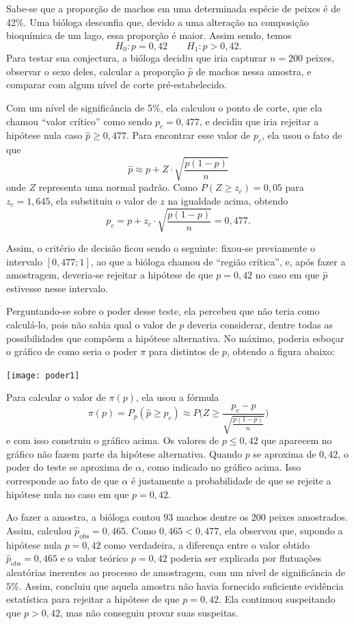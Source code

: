 \documentclass[12pt,a4paper]{article}
\theoremstyle{plain}
\theoremstyle{definition}
\theoremstyle{remark}
\newenvironment{example}{\pushQED{\qed}\renewcommand{\qedsymbol}{\scriptsize$\triangle$}\examplex}{\popQED\endexamplex}
\begin{document}
\begin{example}
Sabe-se que a proporção de machos em uma determinada espécie de peixes é de 42\%. Uma bióloga desconfia que, devido a uma alteração na composição bioquímica de um lago, essa proporção é maior.
Assim sendo, temos
\[
H_0:p=0,42
\qquad
H_1:p>0,42
.
\]
Para testar sua conjectura, a bióloga decidiu que iria capturar $n=200$ peixes, observar o sexo deles, calcular a proporção $\hat{p}$ de machos nessa amostra, e comparar com algum nível de corte pré-estabelecido.

Com um nível de significância de 5\%, ela calculou o ponto de corte, que ela chamou ``valor crítico'' como sendo $p_c=0,477$, e decidiu que iria rejeitar a hipótese nula caso $\hat{p} \geq 0,477$.
Para encontrar esse valor de $p_c$, ela usou o fato de que
\[
\hat{p}
\approx
p + Z \cdot \sqrt{\frac{p(1-p)}{n}}
\]
onde $Z$ representa uma normal padrão.
Como $P(Z\geq z_c)=0,05$ para $z_c = 1,645$, ela substituiu o valor de $z$ na igualdade acima, obtendo
\[
p_c
=
p + z_c \cdot \sqrt{\frac{p(1-p)}{n}}
=
0,477
.
\]

Assim, o critério de decisão ficou sendo o seguinte: fixou-se previamente o intervalo $[0,477; 1]$, ao que a bióloga chamou de ``região crítica'', e, após fazer a amostragem, deveria-se rejeitar a hipótese de que $p=0,42$ no caso em que $\hat{p}$ estivesse nesse intervalo.

Perguntando-se sobre o poder desse teste, ela percebeu que não teria como calculá-lo, pois não sabia qual o valor de $p$ deveria considerar, dentre todas as possibilidades que compõem a hipótese alternativa. No máximo, poderia esboçar o gráfico de como seria o poder $\pi$ para distintos de $p$, obtendo a figura abaixo:

\hfil \texttt{[image: poder1]}

Para calcular o valor de $\pi(p)$, ela usou a fórmula
\[
\pi(p) = P_p(\hat{p} \geq p_c) \approx P\Big(Z \geq \frac{p_c-p}{\sqrt{\frac{p(1-p)}{n}}}\Big)
\]
e com isso construiu o gráfico acima.
Os valores de $p \leq 0,42$ que aparecem no gráfico não fazem parte da hipótese alternativa.
Quando $p$ se aproxima de $0,42$, o poder do teste se aproxima de $\alpha$, como indicado no gráfico acima.
Isso corresponde ao fato de que $\alpha$ é justamente a probabilidade de que se rejeite a hipótese nula no caso em que $p=0,42$.

Ao fazer a amostra, a bióloga contou $93$ machos dentre os $200$ peixes amostrados.
Assim, calculou $\hat{p}_{\mathrm{obs}}=0,465$.
Como $0,465<0,477$, ela observou que, supondo a hipótese nula $p=0,42$ como verdadeira, a diferença entre o valor obtido $\hat{p}_{\mathrm{obs}}=0,465$ e o valor teórico $p=0,42$ poderia ser explicada por flutuações aleatórias inerentes ao processo de amostragem, com um nível de significância de $5\%$.
Assim, concluiu que aquela amostra não havia fornecido suficiente evidência estatística para rejeitar a hipótese de que $p=0,42$.
Ela continuou suspeitando que $p>0,42$, mas não conseguiu provar suas suspeitas.
\end{example}
\end{document}
